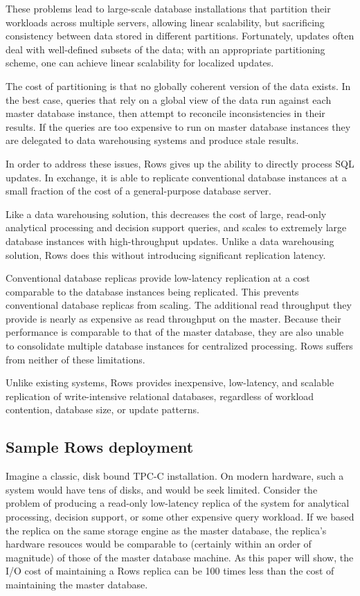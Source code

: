 \documentclass{sig-alternate-sigmod08}
\newcommand{\rows}{Rows\xspace}
\begin{document}
These problems lead to large-scale database installations that partition
their workloads across multiple servers, allowing linear scalability,
but sacrificing consistency between data stored in different
partitions.  Fortunately, updates often deal with well-defined subsets
of the data; with an appropriate partitioning scheme, one can achieve
linear scalability for localized updates.

The cost of partitioning is that no globally coherent version of the
data exists.  In the best case, queries that rely on a global view of
the data run against each master database instance, then attempt to
reconcile inconsistencies in their results.  If the queries are
too expensive to run on master database instances they are delegated
to data warehousing systems and produce stale results.

In order to address these issues, \rows gives up the ability to
directly process SQL updates.  In exchange, it is able to replicate
conventional database instances at a small fraction of the cost of a
general-purpose database server.

Like a data warehousing solution, this decreases the cost of large,
read-only analytical processing and decision support queries, and scales to extremely
large database instances with high-throughput updates.  Unlike a data
warehousing solution, \rows does this without introducing significant
replication latency.

Conventional database replicas provide low-latency replication at a
cost comparable to the database instances being replicated.  This
prevents conventional database replicas from scaling.  The additional
read throughput they provide is nearly as expensive as read throughput
on the master.  Because their performance is comparable to that of the
master database, they are also unable to consolidate multiple database
instances for centralized processing.  \rows suffers from neither of
these limitations.

Unlike existing systems, \rows provides inexpensive, low-latency, and
scalable replication of write-intensive relational databases,
regardless of workload contention, database size, or update patterns.

\subsection{Sample \rows deployment}

Imagine a classic, disk bound TPC-C installation.  On modern hardware,
such a system would have tens of disks, and would be seek limited.
Consider the problem of producing a read-only low-latency replica of
the system for analytical processing, decision support, or some other
expensive query workload.  If we based the replica on the same storage
engine as the master database, the replica's hardware resouces would
be comparable to (certainly within an order of magnitude) of those of
the master database machine.  As this paper will show, the I/O cost of
maintaining a \rows replica can be 100 times less than the cost of
maintaining the master database.
\end{document}
